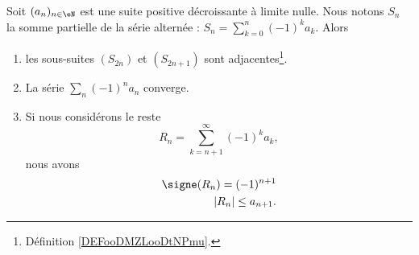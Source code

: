 \begin{theorem}      \label{THOooOHANooHYfkII}
	Soit \( (a_n)_{n\in \eN}\) est une suite positive décroissante à limite nulle. Nous notons \( S_n\) la somme partielle de la série alternée : \( S_n=\sum_{k=0}^n(-1)^ka_k\). Alors
	\begin{enumerate}
		\item
		      les sous-suites \( (S_{2n})\) et \( (S_{2n+1})\) sont adjacentes\footnote{Définition \ref{DEFooDMZLooDtNPmu}.}.
		\item
		      La série \( \sum_n(-1)^na_n\) converge.
		\item       \label{ITEMooWEPWooXhLMYL}
		      Si nous considérons le reste
		      \begin{equation}
			      R_n=\sum_{k=n+1}^{\infty}(-1)^ka_k,
		      \end{equation}
		      nous avons
		      \begin{subequations}
			      \begin{align}
				      \signe(R_n)=(-1)^{n+1} \\
				      | R_n |\leq a_{n+1}.
			      \end{align}
		      \end{subequations}
	\end{enumerate}
\end{theorem}

